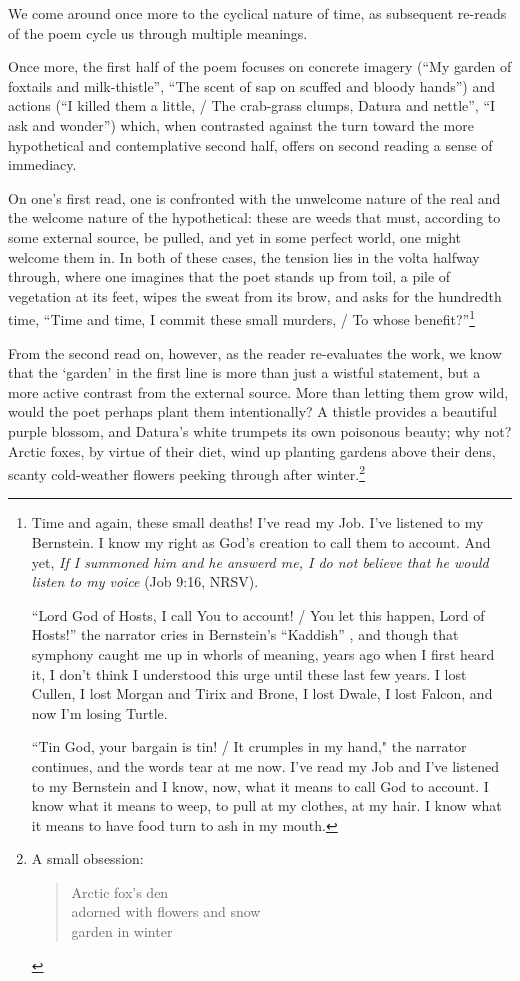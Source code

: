 \documentclass[12pt,oneside]{memoir}
\begin{document}
We come around once more to the cyclical nature of time, as subsequent re-reads of the poem cycle us through multiple meanings.

Once more, the first half of the poem focuses on concrete imagery (``My garden of foxtails and milk-thistle'', ``The scent of sap on scuffed and bloody hands'') and actions (``I killed them a little, / The crab-grass clumps, Datura and nettle'', ``I ask and wonder'') which, when contrasted against the turn toward the more hypothetical and contemplative second half, offers on second reading a sense of immediacy.

On one's first read, one is confronted with the unwelcome nature of the real and the welcome nature of the hypothetical: these are weeds that must, according to some external source, be pulled, and yet in some perfect world, one might welcome them in. In both of these cases, the tension lies in the volta halfway through, where one imagines that the poet stands up from toil, a pile of vegetation at its feet, wipes the sweat from its brow, and asks for the hundredth time, ``Time and time, I commit these small murders, / To whose benefit?''\footnote{Time and again, these small deaths! I've read my Job. I've listened to my Bernstein. I know my right as God's creation to call them to account. And yet, \emph{If I summoned him and he answerd me, I do not believe that he would listen to my voice} (Job 9:16, NRSV).\par
``Lord God of Hosts, I call You to account! / You let this happen, Lord of Hosts!'' the narrator cries in Bernstein's ``Kaddish'' \parencite{kaddish}, and though that symphony caught me up in whorls of meaning, years ago when I first heard it, I don't think I understood this urge until these last few years. I lost Cullen, I lost Morgan and Tirix and Brone, I lost Dwale, I lost Falcon, and now I'm losing Turtle.\par
``Tin God, your bargain is tin! / It crumples in my hand," the narrator continues, and the words tear at me now. I've read my Job and I've listened to my Bernstein and I know, now, what it means to call God to account. I know what it means to weep, to pull at my clothes, at my hair. I know what it means to have food turn to ash in my mouth.}

From the second read on, however, as the reader re-evaluates the work, we know that the `garden' in the first line is more than just a wistful statement, but a more active contrast from the external source. More than letting them grow wild, would the poet perhaps plant them intentionally? A thistle provides a beautiful purple blossom, and Datura's white trumpets its own poisonous beauty; why not? Arctic foxes, by virtue of their diet, wind up planting gardens above their dens, scanty cold-weather flowers peeking through after winter.\footnote{A small obsession:\begin{verse}Arctic fox's den \\
adorned with flowers and snow \\
garden in winter
\end{verse}\parencite{arkie}}
\end{document}

